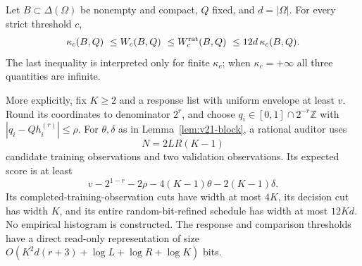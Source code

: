 \begin{theorem}
\label{thm:v21-endtoend}
Let $B\subset\Delta(\Omega)$ be nonempty and compact, $Q$ fixed, and
$d=|\Omega|$. For every strict threshold $c$,
\begin{equation}\label{eq:v21-equivalence}
 \kappa_c(B,Q)\ \le W_c(B,Q)\ \le W_c^{\rm rat}(B,Q)
              \ \le 12d\,\kappa_c(B,Q).
\end{equation}
The last inequality is interpreted only for finite $\kappa_c$; when
$\kappa_c=+\infty$ all three quantities are infinite.

More explicitly, fix $K\ge2$ and a response list with uniform envelope
at least $v$. Round its coordinates to denominator $2^r$, and choose
$q_i\in[0,1]\cap2^{-r}\mathbb Z$ with
$|q_i-Qh_i^{(r)}|\le\rho$. For $\theta,\delta$ as in
Lemma~\ref{lem:v21-block}, a rational auditor uses
\begin{equation}\label{eq:v21-tournament-N}
 N=2LR(K-1)
\end{equation}
candidate training observations and two validation observations. Its
expected score is at least
\begin{equation}\label{eq:v21-tournament-score}
 v-2^{1-r}-2\rho-4(K-1)\theta-2(K-1)\delta.
\end{equation}
Its completed-training-observation cuts have width at most $4K$, its
decision cut has width $K$, and its entire random-bit-refined schedule
has width at most $12Kd$. No empirical histogram is constructed.
The response and comparison thresholds have a direct read-only
representation of size
$O(K^2d(r+3)+\log L+\log R+\log K)$ bits.
\end{theorem}
